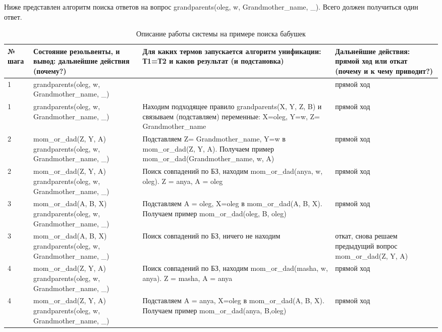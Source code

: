 Ниже представлен алгоритм поиска ответов на вопрос grandparents(oleg, w, Grandmother\_name, \_). Всего должен получиться один ответ.

\begin{table}
	\caption{Описание работы системы на примере поиска бабушек}
	\begin{tabular}{|p{1cm}|p{5cm}|p{5cm}|p{5cm}|}
		\hline
		№ шага & Состояние резольвенты, и вывод: дальнейшие действия (почему?) & Для каких термов запускается алгоритм унификации: Т1=Т2 и каков результат (и подстановка) & Дальнейшие действия: прямой ход или откат (почему и к чему приводит?) \\
		\hline
		1 & grandparents(oleg, w, Grandmother\_name, \_) &  & прямой ход \\
		\hline
		1 & grandparents(oleg, w, Grandmother\_name, \_) & Находим подходящее правило grandparents(X, Y, Z, B) и связываем (подставляем) переменные:  X=oleg, Y=w, Z= Grandmother\_name & прямой ход \\
		\hline
		2 & mom\_or\_dad(Z, Y, A) \newline grandparents(oleg, w, Grandmother\_name, \_) & Подставляем Z= Grandmother\_name, Y=w в mom\_or\_dad(Z, Y, A). Получаем пример mom\_or\_dad(Grandmother\_name, w, A) & прямой ход \\
		\hline
		2 & mom\_or\_dad(Z, Y, A) \newline grandparents(oleg, w, Grandmother\_name, \_) & Поиск совпадений по БЗ, находим mom\_or\_dad(anya, w, oleg). Z = anya, A = oleg & прямой ход \\
		\hline
		3 & mom\_or\_dad(A, B, X) \newline grandparents(oleg, w, Grandmother\_name, \_) & Подставляем A = oleg, X=oleg в mom\_or\_dad(A, B, X). Получаем пример mom\_or\_dad(oleg, B, oleg) & прямой ход \\
		\hline
		3 & mom\_or\_dad(A, B, X) \newline grandparents(oleg, w, Grandmother\_name, \_) & Поиск совпадений по БЗ, ничего не находим & откат, снова решаем предыдущий вопрос mom\_or\_dad(Z, Y, A) \\
		\hline
		4 & mom\_or\_dad(Z, Y, A) \newline grandparents(oleg, w, Grandmother\_name, \_) & Поиск совпадений по БЗ, находим mom\_or\_dad(masha, w, anya). Z = masha, A = anya & прямой ход \\
		\hline
		4 & mom\_or\_dad(Z, Y, A) \newline grandparents(oleg, w, Grandmother\_name, \_) & Подставляем A = anya, X=oleg в mom\_or\_dad(A, B, X). Получаем пример mom\_or\_dad(anya, B,oleg) & прямой ход \\

\end{tabular}
\end{table}
